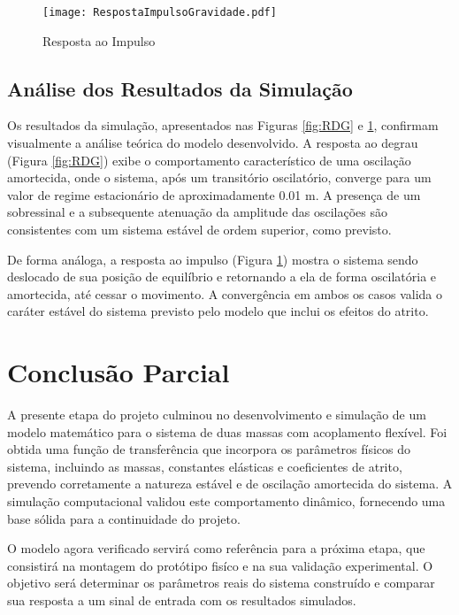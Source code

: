 \documentclass[9pt,a4paper,twocolumn,twoside]{tau-class/tau}
\begin{document}
\begin{figure}[H]
    \centering
    \texttt{[image: RespostaImpulsoGravidade.pdf]}
    \caption{Resposta ao Impulso}
    \label{fig:RIG}
\end{figure}


\subsection{Análise dos Resultados da Simulação}
Os resultados da simulação, apresentados nas Figuras \ref{fig:RDG} e \ref{fig:RIG}, confirmam visualmente a análise teórica do modelo desenvolvido. A resposta ao degrau (Figura \ref{fig:RDG}) exibe o comportamento característico de uma oscilação amortecida, onde o sistema, após um transitório oscilatório, converge para um valor de regime estacionário de aproximadamente 0.01 m. A presença de um sobressinal e a subsequente atenuação da amplitude das oscilações são consistentes com um sistema estável de ordem superior, como previsto.

De forma análoga, a resposta ao impulso (Figura \ref{fig:RIG}) mostra o sistema sendo deslocado de sua posição de equilíbrio e retornando a ela de forma oscilatória e amortecida, até cessar o movimento. A convergência em ambos os casos valida o caráter estável do sistema previsto pelo modelo que inclui os efeitos do atrito.

\section{Conclusão Parcial}

 A presente etapa do projeto culminou no desenvolvimento e simulação de um modelo matemático para o sistema de duas massas com acoplamento flexível. Foi obtida uma função de transferência que incorpora os parâmetros físicos do sistema, incluindo as massas, constantes elásticas e coeficientes de atrito, prevendo corretamente a natureza estável e de oscilação amortecida do sistema. A simulação computacional validou este comportamento dinâmico, fornecendo uma base sólida para a continuidade do projeto.

 O modelo agora verificado servirá como referência para a próxima etapa, que consistirá na montagem do protótipo fisíco e na sua validação experimental. O objetivo será determinar os parâmetros reais do sistema construído e comparar sua resposta a um sinal de entrada com os resultados simulados.



\printbibliography

\end{document}
